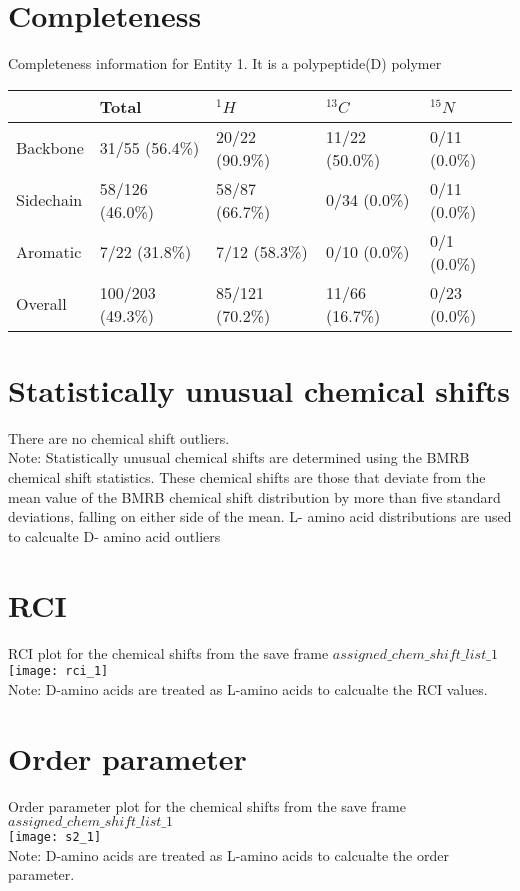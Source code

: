 \section{Completeness}
Completeness information for Entity 1. It is a polypeptide(D) polymer\\
\begin{longtable}{|l|l|l|l|l|}
\hline
  & Total & $^{1}H$ & $^{13}C$ & $^{15}N$\\\hline
Backbone & 31/55 (56.4\%)& 20/22 (90.9\%)& 11/22 (50.0\%)& 0/11 (0.0\%) \\
\hline
Sidechain & 58/126 (46.0\%)& 58/87 (66.7\%)& 0/34 (0.0\%)& 0/11 (0.0\%) \\
\hline
Aromatic & 7/22 (31.8\%)& 7/12 (58.3\%)& 0/10 (0.0\%)& 0/1 (0.0\%) \\
\hline
Overall & 100/203 (49.3\%)& 85/121 (70.2\%)& 11/66 (16.7\%)& 0/23 (0.0\%) \\
\hline
\end{longtable}

\section{Statistically unusual chemical shifts}
There are no chemical shift outliers.\ \\
Note: Statistically unusual chemical shifts are determined using the BMRB chemical shift statistics. These chemical shifts are those that deviate from the mean value of the BMRB chemical shift distribution by more than five standard deviations, falling on either side of the mean.
L- amino acid distributions are used to calcualte D- amino acid outliers
\section{RCI}
RCI plot for the chemical shifts from the  save frame $assigned\_chem\_shift\_list\_1$\\ \texttt{[image: rci\_1]}\\

Note: D-amino acids are treated as L-amino acids to calcualte the RCI values.
\section{Order parameter}
Order parameter plot for the chemical shifts from the  save frame $assigned\_chem\_shift\_list\_1$\\ \texttt{[image: s2\_1]}\\

Note: D-amino acids are treated as L-amino acids to calcualte the order parameter.
